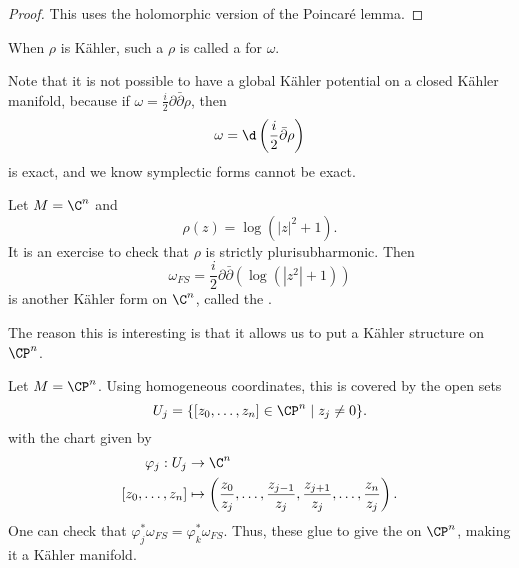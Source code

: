 \documentclass[a4paper]{article}
\begin{document}
\begin{proof}
  This uses the holomorphic version of the Poincar\'e lemma.
\end{proof}

When $\rho$ is K\"ahler, such a $\rho$ is called a  for $\omega$.

Note that it is not possible to have a global K\"ahler potential on a closed K\"ahler manifold, because if $\omega = \frac{i}{2}\partial \bar{\partial} \rho$, then
\[
  \omega = \d \left(\frac{i}{2} \bar{\partial} \rho\right)
\]
is exact, and we know symplectic forms cannot be exact.

\begin{eg}
  Let $M = \C^n$ and
  \[
    \rho(z) = \log (|z|^2 + 1).
  \]
  It is an exercise to check that $\rho$ is strictly plurisubharmonic. Then
  \[
    \omega_{FS} = \frac{i}{2} \partial \bar{\partial} (\log(|z^2| + 1))
  \]
  is another K\"ahler form on $\C^n$, called the .
\end{eg}
The reason this is interesting is that it allows us to put a K\"ahler structure on $\CP^n$.
\begin{eg}
  Let $M = \CP^n$. Using homogeneous coordinates, this is covered by the open sets
  \[
    U_j = \{[z_0, \ldots, z_n] \in \CP^n \mid z_j \not= 0\}.
  \]
  with the chart given by
  \begin{align*}
    \varphi_j: U_j &\to \C^n\\
    [z_0, \ldots, z_n] &\mapsto \left(\frac{z_0}{z_j}, \ldots, \frac{z_{j - 1}}{z_j}, \frac{z_{j + 1}}{z_j}, \ldots, \frac{z_n}{z_j}\right).
  \end{align*}
  One can check that $\varphi_j^* \omega_{FS} = \varphi_k^* \omega_{FS}$. Thus, these glue to give the  on $\CP^n$, making it a K\"ahler manifold.
\end{eg}
\end{document}
